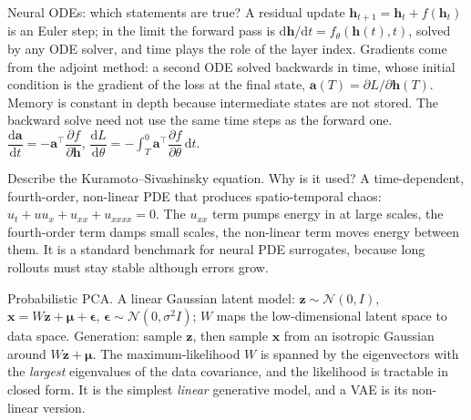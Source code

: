\begin{qabox}[Brandstetter]{\cexam Neural ODEs: which statements are true?}
\ans A residual update $\mathbf{h}_{t+1}=\mathbf{h}_t+f(\mathbf{h}_t)$ is an Euler step; in the limit
the forward pass is $\mathrm{d}\mathbf{h}/\mathrm{d}t=f_\theta(\mathbf{h}(t),t)$, solved by any ODE
solver, and time plays the role of the layer index. Gradients come from the adjoint method: a second
ODE solved backwards in time, whose initial condition is the gradient of the loss at the final state,
$\mathbf{a}(T)=\partial L/\partial\mathbf{h}(T)$. Memory is constant in depth because intermediate
states are not stored. The backward solve need not use the same time steps as the forward one.
\formula $\dfrac{\mathrm{d}\mathbf{a}}{\mathrm{d}t}=-\mathbf{a}^\top\dfrac{\partial f}{\partial\mathbf{h}}$,\quad
$\dfrac{\mathrm{d}L}{\mathrm{d}\theta}=-\displaystyle\int_T^0\mathbf{a}^\top\dfrac{\partial f}{\partial\theta}\,\mathrm{d}t$.
\end{qabox}

\begin{qabox}[Brandstetter]{\cexam Describe the Kuramoto--Sivashinsky equation. Why is it used?}
\ans A time-dependent, fourth-order, non-linear PDE that produces spatio-temporal chaos:
$u_t+uu_x+u_{xx}+u_{xxxx}=0$. The $u_{xx}$ term pumps energy in at large scales, the fourth-order
term damps small scales, the non-linear term moves energy between them. It is a standard benchmark
for neural PDE surrogates, because long rollouts must stay stable although errors grow.
\end{qabox}

\begin{qabox}[Brandstetter]{\cexam Probabilistic PCA.}
\ans A linear Gaussian latent model: $\mathbf{z}\sim\mathcal{N}(0,I)$, $\mathbf{x}=W\mathbf{z}+\bm\mu+\bm\epsilon$,
$\bm\epsilon\sim\mathcal{N}(0,\sigma^2I)$; $W$ maps the low-dimensional latent space to data space.
Generation: sample $\mathbf{z}$, then sample $\mathbf{x}$ from an isotropic Gaussian around $W\mathbf{z}+\bm\mu$.
The maximum-likelihood $W$ is spanned by the eigenvectors with the \emph{largest} eigenvalues of the
data covariance, and the likelihood is tractable in closed form. It is the simplest \emph{linear}
generative model, and a VAE is its non-linear version.
\end{qabox}

